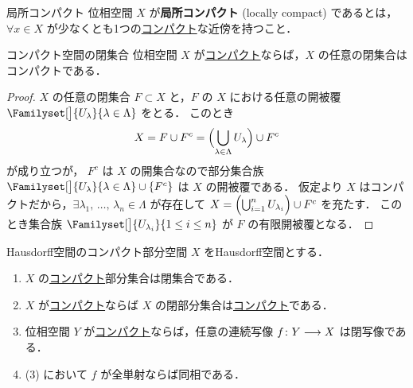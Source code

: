 \documentclass[algtopo_main]{subfiles}
\begin{document}
\begin{mydef}[label=def:loc-compact]{局所コンパクト}
    位相空間 $X$ が\textbf{局所コンパクト} (locally compact) であるとは，$\forall x \in X$ が少なくとも1つの\hyperref[def:compact]{コンパクト}な近傍を持つこと．
\end{mydef}

\begin{mylem}[label=lem:Compact-close]{コンパクト空間の閉集合}
    位相空間 $X$ が\hyperref[def:compact]{コンパクト}ならば，$X$ の任意の閉集合はコンパクトである．
\end{mylem}

\begin{proof}
    $X$ の任意の閉集合 $F \subset X$ と，$F$ の $X$ における任意の開被覆 $\Familyset[\big]{U_\lambda}{\lambda \in \Lambda}$ をとる． 
    このとき
    \begin{align}
        X = F \cup F^c = \Bigl(\bigcup_{\lambda \in \Lambda} U_\lambda \Bigr) \cup F^c
    \end{align}
    が成り立つが， $F^c$ は $X$ の開集合なので部分集合族 $\Familyset[\big]{U_\lambda}{\lambda \in \Lambda} \cup \{F^c\}$ は $X$ の開被覆である．
    仮定より $X$ はコンパクトだから，$\exists \lambda_1,\, \dots ,\, \lambda_n \in \Lambda$ が存在して $X = \Bigl( \bigcup_{i=1}^n U_{\lambda_i} \Bigr) \cup F^c$ を充たす．
    このとき集合族 $\Familyset[\big]{U_{\lambda_i}}{1 \le i \le n}$ が $F$ の有限開被覆となる．
\end{proof}


\begin{mylem}[label=lem:Hausdorff-sub-compact]{Hausdorff空間のコンパクト部分空間}
    $X$ をHausdorff空間とする．
    \begin{enumerate}
        \item $X$ の\hyperref[def:compact]{コンパクト}部分集合は閉集合である．
        \item $X$ が\hyperref[def:compact]{コンパクト}ならば $X$ の閉部分集合は\hyperref[def:compact]{コンパクト}である．
        \item 位相空間 $Y$ が\hyperref[def:compact]{コンパクト}ならば，任意の連続写像 $f \colon Y \longrightarrow X$ は閉写像である．
        \item (3) において $f$ が全単射ならば同相である．
    \end{enumerate}
\end{mylem}
\end{document}
